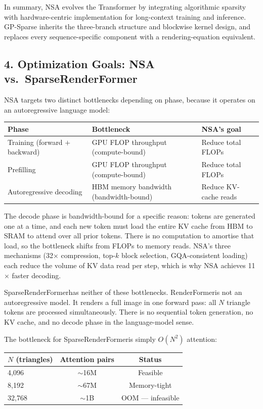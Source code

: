 \documentclass[11pt,letterpaper]{article}
\newcommand{\ours}{SparseRenderFormer}
\newcommand{\RF}{RenderFormer}
\begin{document}
In summary, NSA evolves the Transformer by integrating algorithmic
sparsity with hardware-centric implementation for long-context
training and inference.
GP-Sparse inherits the three-branch structure and blockwise kernel design,
and replaces every sequence-specific component with a rendering-equation
equivalent.

\subsection*{4. Optimization Goals: NSA vs.\ \ours}

NSA targets two distinct bottlenecks depending on phase, because it
operates on an autoregressive language model:

\begin{center}\small
\renewcommand{\arraystretch}{1.3}
\begin{tabular}{@{}lll@{}}
\toprule
\textbf{Phase} & \textbf{Bottleneck} & \textbf{NSA's goal} \\
\midrule
Training (forward $+$ backward) & GPU FLOP throughput (compute-bound) & Reduce total FLOPs \\
Prefilling                       & GPU FLOP throughput (compute-bound) & Reduce total FLOPs \\
Autoregressive decoding          & HBM memory bandwidth (bandwidth-bound) & Reduce KV-cache reads \\
\bottomrule
\end{tabular}
\end{center}

The decode phase is bandwidth-bound for a specific reason: tokens are
generated one at a time, and each new token must load the entire KV cache
from HBM to SRAM to attend over all prior tokens.
There is no computation to amortise that load, so the bottleneck shifts
from FLOPs to memory reads.
NSA's three mechanisms (32$\times$ compression, top-$k$ block selection,
GQA-consistent loading) each reduce the volume of KV data read per step,
which is why NSA achieves 11$\times$ faster decoding.

\ours has neither of these bottlenecks.
\RF is not an autoregressive model.
It renders a full image in one forward pass: all $N$ triangle tokens are
processed simultaneously.
There is no sequential token generation, no KV cache, and no decode phase
in the language-model sense.

The bottleneck for \ours is simply $O(N^2)$ attention:

\begin{center}\small
\renewcommand{\arraystretch}{1.3}
\begin{tabular}{@{}lcc@{}}
\toprule
\textbf{$N$ (triangles)} & \textbf{Attention pairs} & \textbf{Status} \\
\midrule
4{,}096  & $\sim$16M  & Feasible \\
8{,}192  & $\sim$67M  & Memory-tight \\
32{,}768 & $\sim$1B   & OOM --- infeasible \\
\bottomrule
\end{tabular}
\end{center}
\end{document}
